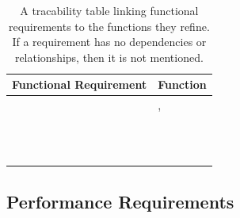 \documentclass{article}
\begin{document}
\begin{table}[!h]
\begin{center}
\caption {A tracability table linking functional requirements to the functions they refine. If a requirement has no dependencies or relationships, then it is not mentioned. }
\label{TRACE_FR_Func}
\begin{tabular}{ | m{7cm} | m{7cm} | }
\hline
Functional Requirement & Function  \\
\hline
\nameref{GEN_001} & \nameref{Autonomous Explore State},\nameref{Autonomous Move State}  \\
\hline
\nameref{STA_000} & \nameref{Idle State}  \\
\hline
\nameref{STA_001} & \nameref{Hover State}  \\
\hline
\nameref{STA_002} & \nameref{Autonomous Move State}  \\
\hline
\nameref{STA_003} & \nameref{Autonomous Explore State}  \\
\hline
\nameref{STA_004} & \nameref{Configure State}  \\
\hline
\nameref{STA_005} & \nameref{Off State}  \\
\hline
\nameref{STA_006} & \nameref{Land State}  \\
\hline
\nameref{STA_007} & \nameref{Desired Location Error State}  \\
\hline
\nameref{STA_008} & \nameref{No Parking Lot Detected Error State}  \\
\hline
\nameref{STA_009} & \nameref{Malfunction State}  \\
\hline
\nameref{STA_010} & \nameref{Communication Lost State}  \\
\hline
\nameref{STA_011} & \nameref{Compulsive Move State}  \\
\hline
\end{tabular}
\end{center}
\end{table}

\clearpage
\newpage

\subsection{Performance Requirements}
\end{document}
